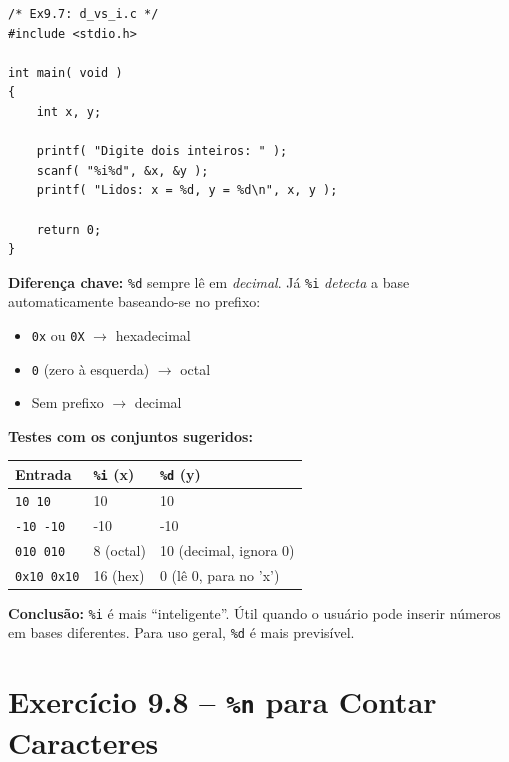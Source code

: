 \documentclass[12pt,a4paper]{article}
\begin{document}
\begin{respostabox}
\begin{lstlisting}
/* Ex9.7: d_vs_i.c */
#include <stdio.h>

int main( void )
{
    int x, y;

    printf( "Digite dois inteiros: " );
    scanf( "%i%d", &x, &y );
    printf( "Lidos: x = %d, y = %d\n", x, y );

    return 0;
}
\end{lstlisting}

\textbf{Diferença chave:} \texttt{\%d} sempre lê em \textit{decimal}. Já \texttt{\%i}
\textit{detecta} a base automaticamente baseando-se no prefixo:
\begin{itemize}[noitemsep]
  \item \texttt{0x} ou \texttt{0X} $\to$ hexadecimal
  \item \texttt{0} (zero à esquerda) $\to$ octal
  \item Sem prefixo $\to$ decimal
\end{itemize}

\textbf{Testes com os conjuntos sugeridos:}
\begin{center}
\renewcommand{\arraystretch}{1.3}
\begin{tabular}{l|l|l}
\toprule
\textbf{Entrada} & \texttt{\%i} (x) & \texttt{\%d} (y) \\ \midrule
\texttt{10 10}     & 10  & 10  \\
\texttt{-10 -10}   & -10 & -10 \\
\texttt{010 010}   & 8 (octal) & 10 (decimal, ignora 0) \\
\texttt{0x10 0x10} & 16 (hex)  & 0 (lê 0, para no 'x') \\
\bottomrule
\end{tabular}
\end{center}

\textbf{Conclusão:} \texttt{\%i} é mais ``inteligente''. Útil quando o usuário pode
inserir números em bases diferentes. Para uso geral, \texttt{\%d} é mais previsível.
\end{respostabox}

\section{Exercício 9.8 -- \texttt{\%n} para Contar Caracteres}
\end{document}

